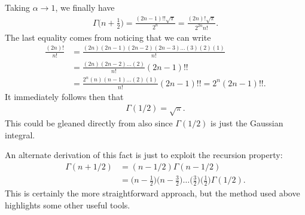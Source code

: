 Taking $\alpha \rightarrow 1$, we finally have
\begin{eqnarray}
    \Gamma\Big( n + \frac{1}{2} \Big) = \frac{(2n -1)!! \sqrt{\pi}}{2^{n}} = \frac{(2n)! \sqrt{\pi}}{2^{2n} n!}
.\end{eqnarray}
The last equality comes from noticing that we can write
\begin{align}
    \frac{(2n)!}{n!} &= \frac{(2n)(2n-1)(2n-2)(2n-3)\ldots(3)(2)(1)}{n!} \nonumber \\
                     &= \frac{(2n)(2n-2)\ldots(2)}{n!} (2n-1)!! \nonumber \\
                     &= \frac{2^{n}(n)(n-1)\ldots(2)(1)}{n!} (2n-1)!! = 2^{n} (2n-1)!!
.\end{align}
It immediately follows then that
\begin{eqnarray}
    \Gamma(1/2) = \sqrt{\pi}
.\end{eqnarray}
This could be gleaned directly from  also since $\Gamma(1/2)$ is just the Gaussian integral.

An alternate derivation of this fact is just to exploit the recursion property:
\begin{align}
    \Gamma(n+1/2) &= (n-1/2)\Gamma(n-1/2) \nonumber \\
                  &= \Big( n - \frac{1}{2} \Big) \Big( n - \frac{3}{2} \Big) \ldots \Big( \frac{3}{2} \Big) \Big( \frac{1}{2} \Big)\Gamma(1/2)
.\end{align}
This is certainly the more straightforward approach, but the method used above highlights some other useful tools.

